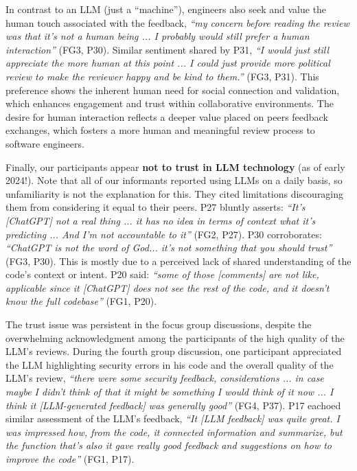 In contrast to an LLM (just a ``machine''), engineers also seek and value the human touch associated with the feedback, \emph{``my concern before reading the review was that it's not a human being ... I probably would still prefer a human interaction''} (FG3, P30). Similar sentiment shared by P31, \emph{``I would just still appreciate the more human at this point ... I could just provide more political review to make the reviewer happy and be kind to them.''} (FG3, P31). This preference shows the inherent human need for social connection and validation, which enhances engagement and trust within collaborative environments. The desire for human interaction reflects a deeper value placed on peers feedback exchanges, which fosters a more human and meaningful review process to software engineers.

Finally, our participants appear \textbf{not to trust in LLM technology} (as of early 2024!). Note that all of our informants reported using LLMs on a daily basis, so unfamiliarity is not the explanation for this. They cited limitations discouraging them from considering it equal to their peers. P27 bluntly asserts: \emph{``It's [ChatGPT] not a real thing ... it has no idea in terms of context what it's predicting ... And I'm not accountable to it''} (FG2, P27). P30 corroborates: \emph{``ChatGPT is not the word of God... it's not something that you should trust''} (FG3, P30). This is mostly due to a perceived lack of shared understanding of the code's context or intent. P20 said: \emph{``some of those [comments] are not like, applicable since it [ChatGPT] does not see the rest of the code, and it doesn't know the full codebase''} (FG1, P20).

The trust issue was persistent in the focus group discussions, despite the overwhelming acknowledgment among the participants of the high quality of the LLM's reviews. During the fourth group discussion, one participant appreciated the LLM highlighting security errors in his code and the overall quality of the LLM's review, \emph{``there were some security feedback, considerations ... in case maybe I didn't think of that it might be something I would think of it now ... I think it [LLM-generated feedback] was generally good''} (FG4, P37). P17 eachoed similar assessment of the LLM's feedback, \emph{``It [LLM feedback] was quite great. I was impressed how, from the code, it connected information and summarize, but the function that's also it gave really good feedback and suggestions on how to improve the code''} (FG1, P17).

